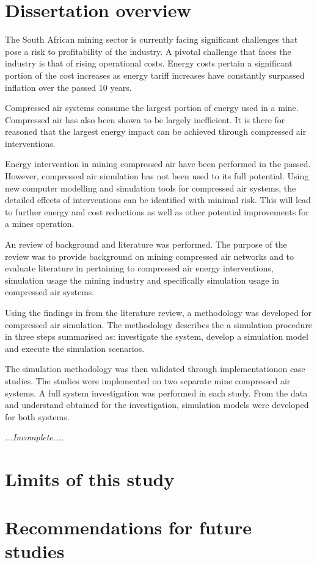 	 \section{Dissertation overview}
	 The South African mining sector is currently facing significant challenges that pose a risk to profitability of the industry. A pivotal challenge that faces the industry is that of rising operational costs. Energy costs pertain a significant portion of the cost increases as energy tariff increases have constantly surpassed inflation over the passed 10 years.
	 \par
	 Compressed air systems consume the largest portion of energy used in a mine. Compressed air has also been shown to be largely inefficient. It is there for reasoned that the largest energy impact can be achieved through compressed air interventions.
	 \par 
	 Energy intervention in mining compressed air have been performed in the passed. However, compressed air simulation has not been used to its full potential. Using new computer modelling and simulation tools for compressed air systems, the detailed effects of interventions can be identified with minimal risk. This will lead to further energy and cost reductions as well as other potential improvements for a mines operation.
	 \par 
	 An review of background and literature was performed. The purpose of the review was to provide background on mining compressed air networks and to evaluate literature in pertaining to compressed air energy interventions, simulation usage the mining industry and specifically simulation usage in compressed air systems.
	 \par 
	 Using the findings in from the literature review, a methodology was developed for compressed air simulation. The methodology describes the a simulation procedure in three steps summarised as: investigate the system, develop a simulation model and execute the simulation scenarios.
	 \par 
	 The simulation methodology was then validated through implementationon case studies. The studies were implemented on two separate mine compressed air systems. A full system investigation was performed in each study. From the data and understand obtained for the investigation, simulation models were developed for both systems.
	 \par
	 \emph{...Incomplete....}
	 \section{Limits of this study}
	 \section{Recommendations for future studies}
	 
	 